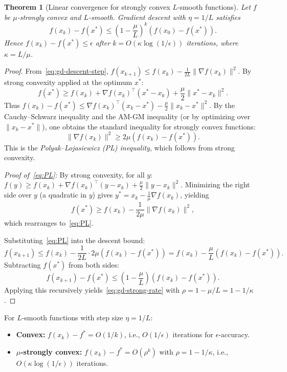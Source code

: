 \documentclass[11pt,a4paper]{article}
\theoremstyle{definition}
\theoremstyle{plain}
\newtheorem{theorem}{Theorem}[section]
\theoremstyle{remark}
\begin{document}
\begin{theorem}[Linear convergence for strongly convex $L$-smooth functions]%
\label{thm:gd-strong}
Let $f$ be $\mu$-strongly convex and $L$-smooth. Gradient descent with
$\eta = 1/L$ satisfies
\begin{equation}\label{eq:gd-strong-rate}
  f(x_k) - f(x^*) \le \left(1 - \frac{\mu}{L}\right)^k (f(x_0) - f(x^*)).
\end{equation}
Hence $f(x_k) - f(x^*) \le \epsilon$ after $k = O(\kappa \log(1/\epsilon))$
iterations, where $\kappa = L/\mu$.
\end{theorem}

\begin{proof}
From~\eqref{eq:gd-descent-step},
$f(x_{k+1}) \le f(x_k) - \frac{1}{2L}\|\nabla f(x_k)\|^2$.
By strong convexity applied at the optimum $x^*$:
\[
  f(x^*) \ge f(x_k) + \nabla f(x_k)^\top(x^* - x_k) + \frac{\mu}{2}\|x^* - x_k\|^2.
\]
Thus $f(x_k) - f(x^*) \le \nabla f(x_k)^\top(x_k - x^*) - \frac{\mu}{2}\|x_k - x^*\|^2$.
By the Cauchy--Schwarz inequality and the AM-GM inequality (or by optimizing
over $\|x_k - x^*\|$), one obtains the standard inequality for strongly convex
functions:
\begin{equation}\label{eq:PL}
  \|\nabla f(x_k)\|^2 \ge 2\mu (f(x_k) - f(x^*)).
\end{equation}
This is the \emph{Polyak--Lojasiewicz (PL) inequality}, which follows from
strong convexity.

\emph{Proof of~\eqref{eq:PL}:} By strong convexity, for all $y$:
$f(y) \ge f(x_k) + \nabla f(x_k)^\top(y - x_k) + \frac{\mu}{2}\|y - x_k\|^2$.
Minimizing the right side over $y$ (a quadratic in $y$) gives
$y^* = x_k - \frac{1}{\mu}\nabla f(x_k)$, yielding
\[
  f(x^*) \ge f(x_k) - \frac{1}{2\mu}\|\nabla f(x_k)\|^2,
\]
which rearranges to~\eqref{eq:PL}.

Substituting~\eqref{eq:PL} into the descent bound:
\[
  f(x_{k+1}) \le f(x_k) - \frac{1}{2L} \cdot 2\mu(f(x_k) - f(x^*))
  = f(x_k) - \frac{\mu}{L}(f(x_k) - f(x^*)).
\]
Subtracting $f(x^*)$ from both sides:
\[
  f(x_{k+1}) - f(x^*) \le \left(1 - \frac{\mu}{L}\right)(f(x_k) - f(x^*)).
\]
Applying this recursively yields~\eqref{eq:gd-strong-rate} with
$\rho = 1 - \mu/L = 1 - 1/\kappa$.
\end{proof}

\begin{keyresult}[title={Gradient Descent Convergence Rates}]
For $L$-smooth functions with step size $\eta = 1/L$:
\begin{itemize}
  \item \textbf{Convex:} $f(x_k) - f^* = O(1/k)$, i.e., $O(1/\epsilon)$
    iterations for $\epsilon$-accuracy.
  \item \textbf{$\mu$-strongly convex:} $f(x_k) - f^* = O(\rho^k)$ with
    $\rho = 1 - 1/\kappa$, i.e., $O(\kappa \log(1/\epsilon))$ iterations.
\end{itemize}
\end{keyresult}
\end{document}
